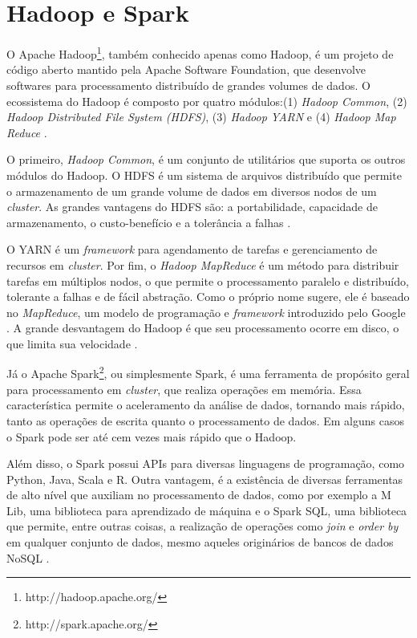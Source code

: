 \section{Hadoop e Spark}
\label{sec:spark}

O Apache Hadoop\footnote{http://hadoop.apache.org/}, também conhecido apenas como Hadoop, 
é um projeto de código aberto mantido pela Apache Software Foundation, que desenvolve 
softwares para processamento distribuído de grandes volumes de dados. O ecossistema do 
Hadoop é composto por quatro módulos:(1) \textit{Hadoop Common}, (2) 
\textit{Hadoop Distributed File System (HDFS)}, (3) \textit{Hadoop YARN} e (4) 
\textit{Hadoop Map Reduce} \cite{kumar2014apache}. 

O primeiro, \textit{Hadoop Common}, é um conjunto de utilitários que suporta os outros módulos
do Hadoop. O HDFS é um sistema de arquivos distribuído que permite o armazenamento de um 
grande volume de dados em diversos nodos de um \textit{cluster}. As grandes vantagens do HDFS 
são: a portabilidade, capacidade de armazenamento, o custo-benefício e a tolerância a falhas 
\cite{kumar2014apache}.

O YARN é um \textit{framework} para agendamento de tarefas e gerenciamento de recursos em 
\textit{cluster}. Por fim, o \textit{Hadoop MapReduce} é um método para distribuir tarefas 
em múltiplos nodos, o que permite o processamento paralelo e distribuído, tolerante a 
falhas e de fácil abstração. Como o próprio nome sugere, ele é baseado no \textit{MapReduce}, 
um modelo de programação e \textit{framework} introduzido pelo Google \cite{kumar2014apache}. 
A grande desvantagem do Hadoop é que seu processamento ocorre em disco, o que limita sua 
velocidade \cite{shoro2015big}.

Já o Apache Spark\footnote{http://spark.apache.org/}, ou simplesmente Spark, é uma ferramenta 
de propósito geral para processamento em \textit{cluster}, que realiza operações em memória. 
Essa característica permite o aceleramento da análise de dados, tornando mais rápido, 
tanto as operações de escrita quanto o processamento de dados. Em alguns casos o Spark pode ser 
até cem vezes mais rápido que o Hadoop. 

Além disso, o Spark possui APIs para diversas linguagens de programação, como Python, Java, 
Scala e R. Outra vantagem, é a existência de diversas ferramentas de alto nível que auxiliam 
no processamento de dados, como por exemplo a M Lib, uma biblioteca para aprendizado de 
máquina e o Spark SQL, uma biblioteca que permite, entre outras coisas, a realização de 
operações como \textit{join} e \textit{order by} em qualquer conjunto de dados, mesmo 
aqueles originários de bancos de dados NoSQL \cite{shoro2015big}.

